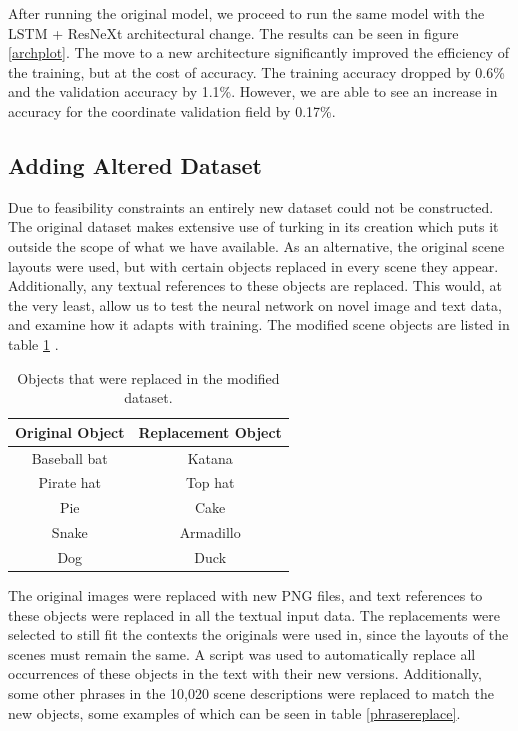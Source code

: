 \documentclass[10pt,twocolumn,letterpaper]{article}
\begin{document}
After running the original model, we proceed to run the same model with the LSTM + ResNeXt architectural change. The results can be seen in figure \ref{archplot}. The move to a new architecture significantly improved the efficiency of the training, but at the cost of accuracy. The training accuracy dropped by 0.6\% and the validation accuracy by 1.1\%. However, we are able to see an increase in accuracy for the coordinate validation field by 0.17\%.

\subsection{Adding Altered Dataset}

Due to feasibility constraints an entirely new dataset could not be constructed. The original dataset makes extensive use of turking in its creation which puts it outside the scope of what we have available. As an alternative, the original scene layouts were used, but with certain objects replaced in every scene they appear. Additionally, any textual references to these objects are replaced. This would, at the very least, allow us to test the neural network on novel image and text data, and examine how it adapts with training. The modified scene objects are listed in table \ref{objectrep} .

\begin{table}
\begin{center}
\begin{tabular}{|c|c|}
\hline
Original Object & Replacement Object \\
\hline\hline
Baseball bat & Katana \\
Pirate hat & Top hat \\
Pie & Cake\\
Snake & Armadillo\\
Dog & Duck\\
\hline
\end{tabular}
\end{center}
\caption{Objects that were replaced in the modified dataset.}
\label{objectrep}
\end{table}

The original images were replaced with new PNG files, and text references to these objects were replaced in all the textual input data. The replacements were selected to still fit the contexts the originals were used in, since the layouts of the scenes must remain the same. A script was used to automatically replace all occurrences of these objects in the text with their new versions. Additionally, some other phrases in the 10,020 scene descriptions were replaced to match the new objects, some examples of which can be seen in table \ref{phrasereplace}.
\end{document}
